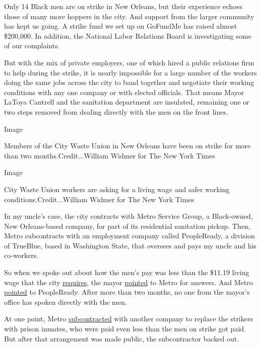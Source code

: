 Only 14 Black men are on strike in New Orleans, but their experience
echoes those of many more hoppers in the city. And support from the
larger community has kept us going. A strike fund we set up on GoFundMe
has raised almost \$200,000. In addition, the National Labor Relations
Board is investigating some of our complaints.

But with the mix of private employers, one of which hired a public
relations firm to help during the strike, it is nearly impossible for a
large number of the workers doing the same jobs across the city to band
together and negotiate their working conditions with any one company or
with elected officials. That means Mayor LaToya Cantrell and the
sanitation department are insulated, remaining one or two steps removed
from dealing directly with the men on the front lines.

Image

Members of the City Waste Union in New Orleans have been on strike for
more than two months.Credit...William Widmer for The New York Times

Image

City Waste Union workers are asking for a living wage and safer working
conditions.Credit...William Widmer for The New York Times

In my uncle's case, the city contracts with Metro Service Group, a
Black-owned, New Orleans-based company, for part of its residential
sanitation pickup. Then, Metro subcontracts with an employment company
called PeopleReady, a division of TrueBlue, based in Washington State,
that oversees and pays my uncle and his co-workers.

So when we spoke out about how the men's pay was less than the \$11.19
living wage that the city
\href{https://www.nola.gov/economic-development/workforce-development/living-wage/}{requires},
the mayor
\href{https://www.nola.com/news/coronavirus/article_e96a4e14-995a-11ea-87ed-cf029941ee9a.html}{pointed}
to Metro for answers. And Metro
\href{https://www.nola.com/news/business/article_b37bb7ee-b64b-11ea-ac72-eb8ecb99b035.html}{pointed}
to PeopleReady. After more than two months, no one from the mayor's
office has spoken directly with the men.

At one point, Metro
\href{https://www.nola.com/news/coronavirus/article_336a7742-93d3-11ea-a344-1bdefd47e647.html}{subcontracted}
with another company to replace the strikers with prison inmates, who
were paid even less than the men on strike got paid. But after that
arrangement was made public, the subcontractor backed out.

